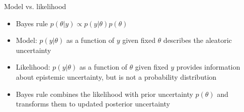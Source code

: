 \documentclass[english,t]{beamer}
\begin{document}


\begin{frame}{Model vs. likelihood}

  \begin{itemize}
  \item Bayes rule
      $p(\theta|y)\propto p(y|\theta)p(\theta)$
    \vspace{\baselineskip}
  \item Model: $p(y|\theta)$ as a function of $y$ given fixed $\theta$
    describes the aleatoric uncertainty \vspace{\baselineskip}
  \item Likelihood: $p(y|\theta)$ %
    as a function of $\theta$
    given fixed $y$ provides information about epistemic uncertainty,
    but is not a probability distribution
    \vspace{\baselineskip}
  \item<2-> Bayes rule combines the likelihood with prior uncertainty
    $p(\theta)$ and transforms them to updated posterior uncertainty
  \end{itemize}
\end{frame}


  
\end{document}
